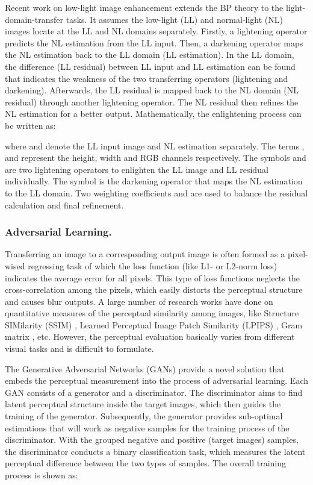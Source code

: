 \documentclass[runningheads]{llncs}
\begin{document}
Recent work on low-light image enhancement \cite{DLN2020}  extends the BP theory to the light-domain-transfer tasks. It assumes the low-light (LL) and normal-light (NL) images locate at the LL and NL domains separately. Firstly, a lightening operator predicts the NL estimation from the LL input. Then, a darkening operator maps the NL estimation back to the LL domain (LL estimation). In the LL domain, the difference (LL residual) between LL input and LL estimation can be found that indicates the weakness of the two transferring operators (lightening and darkening). Afterwards, the LL residual is mapped back to the NL domain (NL residual) through another lightening operator. The NL residual then refines the NL estimation for a better output. Mathematically, the enlightening process can be written as:

where  and   denote the LL input image and NL estimation separately. The terms ,  and  represent the height, width and RGB channels respectively. The symbols  and  are two lightening operators to enlighten the LL image and LL residual individually. The symbol  is the darkening operator that maps the NL estimation to the LL domain. Two weighting coefficients  and  are used to balance the residual calculation and final refinement.

\vskip -0.5cm
\baselineskip 
\subsubsection{Adversarial Learning.}
Transferring an image to a corresponding output image is often formed as a pixel-wised regressing task of which the loss function (like L1- or L2-norm loss) indicates the average error for all pixels. This type of loss functions neglects the cross-correlation among the pixels, which easily distorts the perceptual structure and causes blur outputs. A large number of research works have done on quantitative measures of the perceptual similarity among images, like  Structure SIMilarity (SSIM) \cite{SSIM}, Learned Perceptual Image Patch Similarity (LPIPS) \cite{LPIPS}, Gram matrix \cite{grammatri}, etc. However, the perceptual evaluation basically varies from different visual tasks and is difficult to formulate.

The Generative Adversarial Networks (GANs) \cite{GAN,pix2pix,cGAN} provide a novel solution that embeds the perceptual measurement into the process of adversarial learning. Each GAN consists of a generator and a discriminator. The discriminator aims to find latent perceptual structure inside the target images, which then guides the training of the generator. Subsequently, the generator provides sub-optimal estimations that will work as negative samples for the training process of the discriminator. With the grouped negative and positive (target images) samples, the discriminator conducts a binary classification task, which measures the latent perceptual difference between the two types of samples. The overall training process is shown as:
\end{document}

